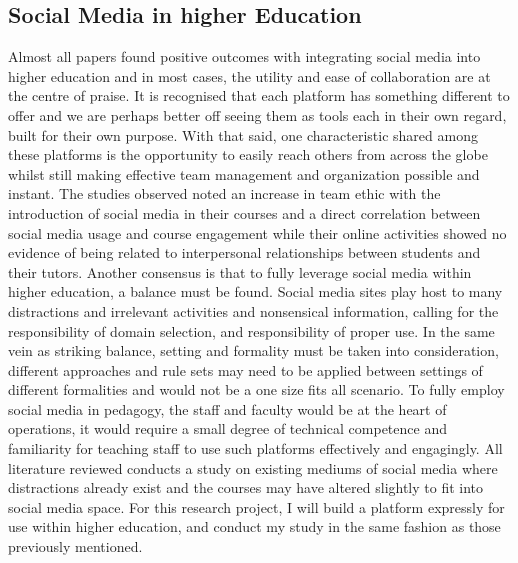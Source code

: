 \documentclass[lettersize,journal]{IEEEtran}
\begin{document}
	\subsection{Social Media in higher Education}
	Almost all papers found positive outcomes with integrating social media into higher education and in most cases, the utility and ease
	of collaboration are at the centre of praise. It is recognised that each platform has something different to offer and we are perhaps 
	better off seeing them as tools each in their own regard, built for their own purpose. With that said, one characteristic shared among these platforms
	 is the opportunity to easily reach others from across the globe whilst still making effective team management and organization possible and instant.
	 The studies observed noted an increase in team ethic with the introduction of social media in their courses and a direct correlation between
	 social media usage and course engagement while their online activities showed no evidence of being related to interpersonal relationships
	 between students and their tutors. Another consensus is that to fully leverage social media within higher education, a balance must be found.
	 Social media sites play host to many distractions and irrelevant activities and nonsensical information, calling for the responsibility of domain
	 selection, and responsibility of proper use. In the same vein as striking balance, setting and formality must be taken into consideration, different
	 approaches and rule sets may need to be applied between settings of different formalities and would not be a one size fits all scenario. To fully 
	 employ social media in pedagogy, the staff and faculty would be at the heart of operations, it would require a small degree of technical competence and
	 familiarity for teaching staff to use such platforms effectively and engagingly.
	 All literature reviewed conducts a study on existing mediums of social media where distractions already exist and the courses may have altered slightly  to
	 fit into social media space. For this research project, I will build a platform expressly for use within higher education,
	 and conduct my study in the same fashion as those previously mentioned.
\end{document}
